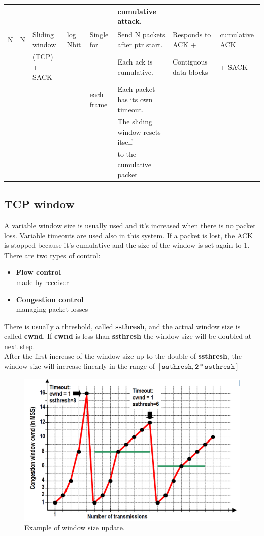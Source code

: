 \begin{table}
\begin{tabular}{|llllllll|}
& & & & & {cumulative attack.} & &\\
\hline
N & N  & {Sliding window} & {log Nbit} & {Single for} & {Send N packets after ptr start.} & {Responds to ACK +} & {cumulative ACK}\\
& & {(TCP) + SACK}& & & {Each ack is cumulative.} & {Contiguous data blocks} & {+ SACK}\\
& & & & {each frame} & {Each packet has its own timeout.} & &\\
& & & & & {The sliding window resets itself} & &\\
& & & & & {to the cumulative packet} & &\\
\hline
\end{tabular}
\end{table}
\vspace{13cm}
\subsection{TCP window}
A variable window size is usually used and it's increased when there is no packet loss. Variable timeouts are used also in this system. If a packet is lost, the ACK is stopped because it's cumulative and the size of the window is set again to 1.\\
There are two types of control:
\begin{itemize}
\item{\textbf{Flow control}\\
made by receiver}
\item{\textbf{Congestion control}\\
managing packet losses}
\end{itemize}
There is usually a threshold, called \textbf{ssthresh}, and the actual window size is called \textbf{cwnd}. If \textbf{cwnd} is less than \textbf{ssthresh}
the window size will be doubled at next step.\\
After the first increase of the window size up to the double of \textbf{ssthresh}, the window size will increase linearly in the range of \textbf{$\mathtt{[ssthresh, 2*ssthresh]}$}
\begin{figure}[H]
\centering\footnotesize
\includegraphics[scale=0.4]{Images/Transport/example_cwnd}
\caption{Example of window size update.}\label{cwnd}
\end{figure}